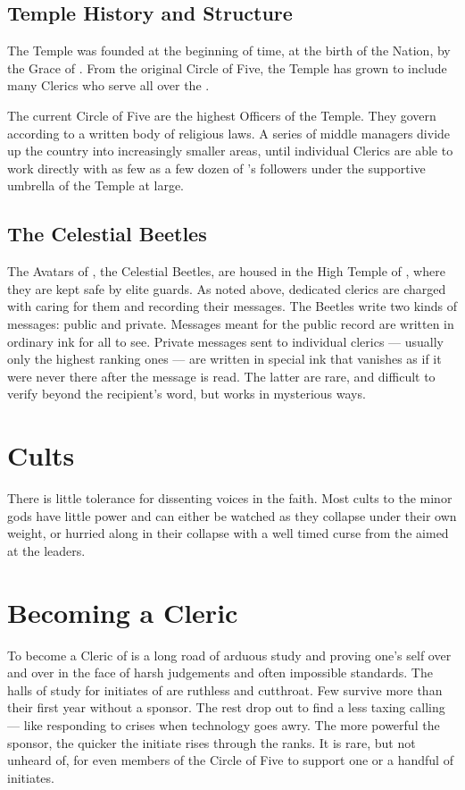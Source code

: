 \documentclass[blue]{GL2020}
\begin{document}
\subsection*{Temple History and Structure}
The Temple was founded at the beginning of time, at the birth of the Nation, by the Grace of \cTechGod{}. From the original Circle of Five, the Temple has grown to include many Clerics who serve all over the \pTech{}.

The current Circle of Five are the highest Officers of the Temple. They govern according to a written body of religious laws. A series of middle managers divide up the country into increasingly smaller areas, until individual Clerics are able to work directly with as few as a few dozen of \cTechGod{}'s followers under the supportive umbrella of the Temple at large.

\subsection*{The Celestial Beetles}
The Avatars of \cTechGod{}, the Celestial Beetles, are housed in the High Temple of \cTechGod{}, where they are kept safe by elite guards. As noted above, dedicated clerics are charged with caring for them and recording their messages. The Beetles write two kinds of messages: public and private. Messages meant for the public record are written in ordinary ink for all to see. Private messages sent to individual clerics — usually only the highest ranking ones — are written in special ink that vanishes as if it were never there after the message is read. The latter are rare, and difficult to verify beyond the recipient’s word, but \cTechGod{} works in mysterious ways.

\section*{Cults}
There is little tolerance for dissenting voices in the faith. Most cults to the minor gods have little power and can either be watched as they collapse under their own weight, or hurried along in their collapse with a well timed curse from the \pFarmers{} aimed at the leaders.

\section*{Becoming a Cleric}
To become a Cleric of \cTechGod{} is a long road of arduous study and proving one’s self over and over in the face of harsh judgements and often impossible standards. The halls of study for initiates of \pTech{} are ruthless and cutthroat. Few survive more than their first year without a sponsor. The rest drop out to find a less taxing calling — like responding to crises when technology goes awry. The more powerful the sponsor, the quicker the initiate rises through the ranks. It is rare, but not unheard of, for even members of the Circle of Five to support one or a handful of initiates.
\end{document}
